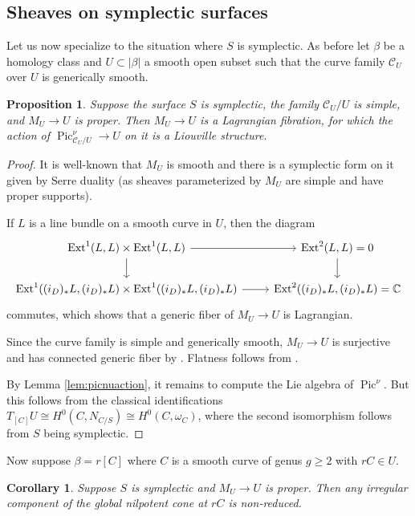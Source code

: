 \documentclass{amsart}
\theoremstyle{plain}
\newtheorem{proposition}[theorem]{Proposition}
\newtheorem{corollary}[theorem]{Corollary}
\theoremstyle{definition}
\theoremstyle{remark}
\begin{document}
\subsection{Sheaves on symplectic surfaces}
Let us now specialize to the situation where $S$ is symplectic.
As before let $\beta$ be a homology class and $U\subset|\beta|$ a smooth open subset such that the curve family $\mathcal C_U$ over $U$ is generically smooth.
\begin{proposition}
    Suppose the surface $S$ is symplectic, the family $\mathcal C_U/U$ is simple, and $M_U\to U$ is proper.
    Then $M_U\to U$ is a Lagrangian fibration, for which the action of $\operatorname{Pic}^\nu_{\mathcal C_U/U}\to U$ on it is a Liouville structure.
\end{proposition}
\begin{proof}
    It is well-known that $M_U$ is smooth and there is a symplectic form on it given by Serre duality (as sheaves parameterized by $M_U$ are simple and have proper supports).

    If $L$ is a line bundle on a smooth curve in $U$, then the diagram
    \[\begin{tikzcd}
        \operatorname{Ext}^1(L,L)\times\operatorname{Ext}^1(L,L)\rar\dar&\operatorname{Ext}^2(L,L)=0\dar\\
        \operatorname{Ext}^1((i_{D})_\ast L,(i_{D})_\ast L)\times \operatorname{Ext}^1((i_{D})_\ast L,(i_{D})_\ast L)\rar&\operatorname{Ext}^2((i_{D})_\ast L,(i_{D})_\ast L)=\mathbb C
    \end{tikzcd}\]
    commutes, which shows that a generic fiber of $M_U\to U$ is Lagrangian.

    Since the curve family is simple and generically smooth, $M_U\to U$ is surjective and has connected generic fiber by .
    Flatness follows from \cite{matequid}.

    By Lemma \ref{lem:picnuaction}, it remains to compute the Lie algebra of $\operatorname{Pic}^\nu$.
    But this follows from the classical identifications $T_{[C]}U\cong H^0(C,N_{C/S})\cong H^0(C,\omega_C)$, where the second isomorphism follows from $S$ being symplectic.
\end{proof}
Now suppose $\beta=r[C]$ where $C$ is a smooth curve of genus $g\ge 2$ with $rC\in U$.
\begin{corollary}\label{symp:irreg_nonred}
    Suppose $S$ is symplectic and $M_U\to U$ is proper.
    Then any irregular component of the global nilpotent cone at $rC$ is non-reduced.
\end{corollary}
\end{document}
